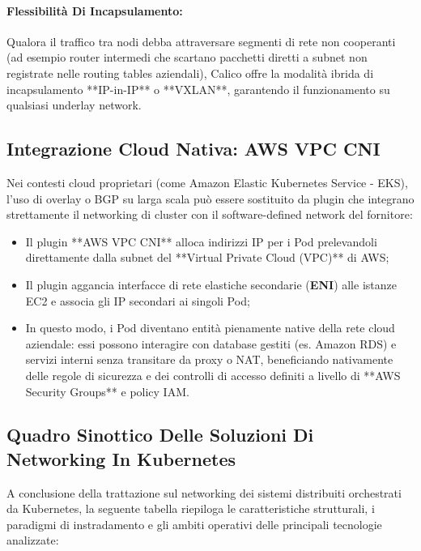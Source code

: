\documentclass[11pt, a4paper]{article}
\begin{document}
\paragraph{Flessibilità Di Incapsulamento:} Qualora il traffico tra nodi debba attraversare segmenti di rete non cooperanti (ad esempio router intermedi che scartano pacchetti diretti a subnet non registrate nelle routing tables aziendali), Calico offre la modalità ibrida di incapsulamento **IP-in-IP** o **VXLAN**, garantendo il funzionamento su qualsiasi underlay network.

\subsection{Integrazione Cloud Nativa: AWS VPC CNI}

Nei contesti cloud proprietari (come Amazon Elastic Kubernetes Service - EKS), l'uso di overlay o BGP su larga scala può essere sostituito da plugin che integrano strettamente il networking di cluster con il software-defined network del fornitore:
\begin{itemize}[noitemsep]
    \item Il plugin **AWS VPC CNI** alloca indirizzi IP per i Pod prelevandoli direttamente dalla subnet del **Virtual Private Cloud (VPC)** di AWS;
    \item Il plugin aggancia interfacce di rete elastiche secondarie (\textbf{ENI}) alle istanze EC2 e associa gli IP secondari ai singoli Pod;
    \item In questo modo, i Pod diventano entità pienamente native della rete cloud aziendale: essi possono interagire con database gestiti (es. Amazon RDS) e servizi interni senza transitare da proxy o NAT, beneficiando nativamente delle regole di sicurezza e dei controlli di accesso definiti a livello di **AWS Security Groups** e policy IAM.
\end{itemize}

\subsection{Quadro Sinottico Delle Soluzioni Di Networking In Kubernetes}

A conclusione della trattazione sul networking dei sistemi distribuiti orchestrati da Kubernetes, la seguente tabella riepiloga le caratteristiche strutturali, i paradigmi di instradamento e gli ambiti operativi delle principali tecnologie analizzate:
\end{document}
